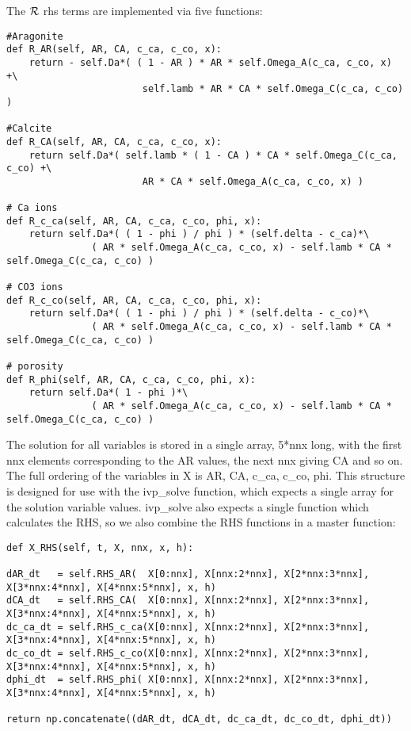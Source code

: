\documentclass[a4paper]{article}
\begin{document}
The ${\cal R}$ rhs terms are implemented via five functions:
\begin{lstlisting}
#Aragonite
def R_AR(self, AR, CA, c_ca, c_co, x):
    return - self.Da*( ( 1 - AR ) * AR * self.Omega_A(c_ca, c_co, x) +\
                        self.lamb * AR * CA * self.Omega_C(c_ca, c_co) )

#Calcite
def R_CA(self, AR, CA, c_ca, c_co, x):
    return self.Da*( self.lamb * ( 1 - CA ) * CA * self.Omega_C(c_ca, c_co) +\
                        AR * CA * self.Omega_A(c_ca, c_co, x) )

# Ca ions
def R_c_ca(self, AR, CA, c_ca, c_co, phi, x):
    return self.Da*( ( 1 - phi ) / phi ) * (self.delta - c_ca)*\
               ( AR * self.Omega_A(c_ca, c_co, x) - self.lamb * CA * self.Omega_C(c_ca, c_co) )

# CO3 ions
def R_c_co(self, AR, CA, c_ca, c_co, phi, x):
    return self.Da*( ( 1 - phi ) / phi ) * (self.delta - c_co)*\
               ( AR * self.Omega_A(c_ca, c_co, x) - self.lamb * CA * self.Omega_C(c_ca, c_co) )

# porosity
def R_phi(self, AR, CA, c_ca, c_co, phi, x):
    return self.Da*( 1 - phi )*\
               ( AR * self.Omega_A(c_ca, c_co, x) - self.lamb * CA * self.Omega_C(c_ca, c_co) )
\end{lstlisting}

The solution for all variables is stored in a single array, 5*nnx long, with the first nnx elements corresponding to the AR values, the next nnx giving CA and so on.  The full ordering of the variables in X is AR, CA, c\_ca, c\_co, phi.  This structure is designed for use with the ivp\_solve function, which expects a single array for the solution variable values.  ivp\_solve also expects a single function which calculates the RHS, so we also combine the RHS functions in a master function:
\begin{lstlisting}
def X_RHS(self, t, X, nnx, x, h):
        
dAR_dt   = self.RHS_AR(  X[0:nnx], X[nnx:2*nnx], X[2*nnx:3*nnx], X[3*nnx:4*nnx], X[4*nnx:5*nnx], x, h)
dCA_dt   = self.RHS_CA(  X[0:nnx], X[nnx:2*nnx], X[2*nnx:3*nnx], X[3*nnx:4*nnx], X[4*nnx:5*nnx], x, h)
dc_ca_dt = self.RHS_c_ca(X[0:nnx], X[nnx:2*nnx], X[2*nnx:3*nnx], X[3*nnx:4*nnx], X[4*nnx:5*nnx], x, h)
dc_co_dt = self.RHS_c_co(X[0:nnx], X[nnx:2*nnx], X[2*nnx:3*nnx], X[3*nnx:4*nnx], X[4*nnx:5*nnx], x, h)
dphi_dt  = self.RHS_phi( X[0:nnx], X[nnx:2*nnx], X[2*nnx:3*nnx], X[3*nnx:4*nnx], X[4*nnx:5*nnx], x, h)
        
return np.concatenate((dAR_dt, dCA_dt, dc_ca_dt, dc_co_dt, dphi_dt)) 
\end{lstlisting}
\end{document}
